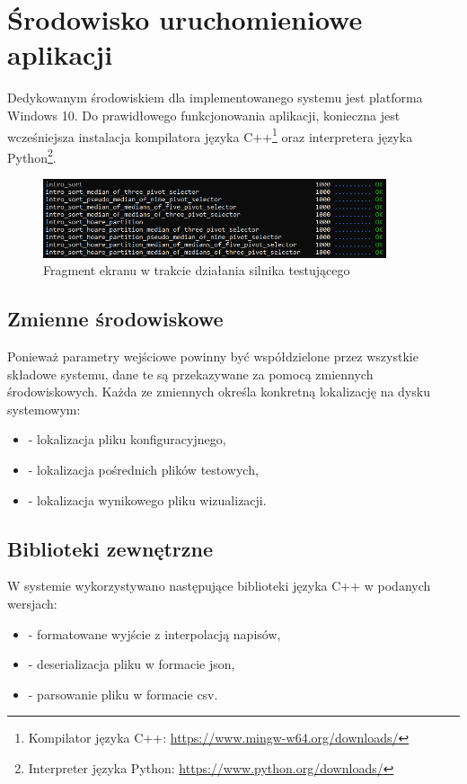\chapter{Środowisko uruchomieniowe aplikacji}
\thispagestyle{chapterBeginStyle}
Dedykowanym środowiskiem dla implementowanego systemu jest platforma Windows 10. Do prawidłowego funkcjonowania aplikacji, konieczna jest wcześniejsza instalacja kompilatora języka C++\footnote{Kompilator języka C++: \url{https://www.mingw-w64.org/downloads/}} oraz interpretera języka Python\footnote{Interpreter języka Python: \url{https://www.python.org/downloads/}}.\\

\begin{figure}[H]
	\centering
	\includegraphics[width=0.9\textwidth]{img/screen}
	\caption[]{Fragment ekranu w trakcie działania silnika testującego}
	\label{fig:screen}
\end{figure}


\section{Zmienne środowiskowe}
Ponieważ parametry wejściowe powinny być współdzielone przez wszystkie składowe systemu, dane te są przekazywane za pomocą zmiennych środowiskowych. Każda ze zmiennych określa konkretną lokalizację na dysku systemowym:

\begin{itemize}
	\setlength\itemsep{0em}
	\item {} - lokalizacja pliku konfiguracyjnego,
	\item {} - lokalizacja pośrednich plików testowych,
	\item {} - lokalizacja wynikowego pliku wizualizacji.
\end{itemize}

\section{Biblioteki zewnętrzne}
W systemie wykorzystywano następujące biblioteki języka C++ w podanych wersjach:
\begin{itemize}
	\setlength\itemsep{0em}
	\item {} - formatowane wyjście z interpolacją napisów,
	\item {} - deserializacja pliku w formacie json,
	\item {} - parsowanie pliku w formacie csv.
\end{itemize}

